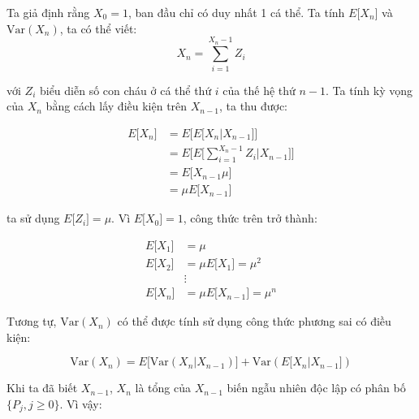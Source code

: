 \documentclass[14pt, a4paper]{article}
\numberwithin{equation}{section}
\numberwithin{figure}{section}
\theoremstyle{sltheorem}
\theoremstyle{soltheorem}
\numberwithin{dl}{section}
\numberwithin{md}{section}
\numberwithin{vd}{section}
\begin{document}
    Ta giả định rằng $X_0 = 1$, ban đầu chỉ có duy nhất 1 cá thể.
    Ta tính $E \lbrack X_n \rbrack$ và $\mathrm{Var} (X_n)$, ta có thể viết:
    \begin{equation*}
        X_n = \sum_{i=1}^{X_n - 1} Z_i
    \end{equation*}

    với $Z_i$ biểu diễn số con cháu ở cá thể thứ $i$ của thế hệ thứ $n-1$.
    Ta tính kỳ vọng của $X_n$ bằng cách lấy điều kiện trên $X_{n-1}$, ta thu được:

    \begin{equation*}
        \begin{aligned}
            E \lbrack X_n \rbrack &= E \lbrack E \lbrack X_n \vert X_{n-1} \rbrack \rbrack \\
            &= E \Bigg \lbrack E \Bigg \lbrack \sum_{i=1}^{X_n - 1} Z_i \vert X_{n-1} \Bigg \rbrack \Bigg \rbrack \\
            &= E \lbrack X_{n-1} \mu \rbrack \\
            &= \mu E \lbrack X_{n-1} \rbrack
        \end{aligned}
    \end{equation*}

    ta sử dụng $E \lbrack Z_i \rbrack = \mu$. Vì $E \lbrack X_0 \rbrack = 1$, công thức trên trở thành:

    \begin{equation*}
        \begin{aligned}
            E \lbrack X_1 \rbrack &= \mu \\
            E \lbrack X_2 \rbrack &= \mu E \lbrack X_1 \rbrack = \mu^2 \\
            & \vdots \\
            E \lbrack X_n \rbrack &= \mu E \lbrack X_{n-1} \rbrack = \mu^n
        \end{aligned}
    \end{equation*}

    Tương tự, $\mathrm{Var} (X_n)$ có thể được tính sử dụng công thức phương sai có điều kiện:

    \begin{equation*}
        \mathrm{Var} (X_n) = E \lbrack \mathrm{Var} (X_n \vert X_{n-1}) \rbrack + \mathrm{Var} (E \lbrack X_n \vert X_{n-1} \rbrack)
    \end{equation*}

    Khi ta đã biết $X_{n-1}$, $X_n$ là tổng của $X_{n-1}$ biến ngẫu nhiên độc lập có phân bố $\lbrace P_j, j \geq 0 \rbrace$.
    Vì vậy:
\end{document}
